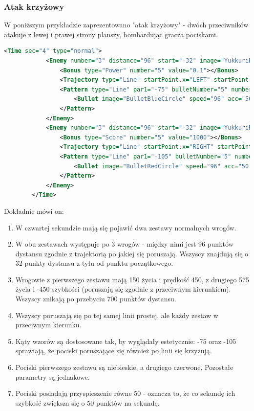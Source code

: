 		
		\newpage
		\subsubsection{Atak krzyżowy}
		W poniższym przykładzie zaprezentowano "atak krzyżowy" - dwóch przeciwników atakuje z lewej i prawej strony planszy, bombardując gracza pociskami.
		\begin{lstlisting}[language=xml]
		<Time sec="4" type="normal">
			<Enemy number="3" distance="96" start="-32" image="YukkuriReimu" life="150" speed="450" length="700">
				<Bonus type="Power" number="5" value="0.1"></Bonus>
				<Trajectory type="Line" startPoint.x="LEFT" startPoint.y="ONE_THIRDS" a="0"></Trajectory>
				<Pattern type="Line" par1="-75" bulletNumber="5" number="15" interval="0.1">
					<Bullet image="BulletBlueCircle" speed="96" acc="50.0" width="32" height="32" hitboxSize="HALF"></Bullet>
				</Pattern>
			</Enemy>
			<Enemy number="3" distance="96" start="-32" image="YukkuriReimu" life="575" speed="-450" length="700">
				<Bonus type="Score" number="5" value="1000"></Bonus>
				<Trajectory type="Line" startPoint.x="RIGHT" startPoint.y="ONE_THIRDS" a="0"></Trajectory>
				<Pattern type="Line" par1="-105" bulletNumber="5" number="15" interval="0.1">
					<Bullet image="BulletRedCircle" speed="96" acc="50.0" width="32" height="32" hitboxSize="HALF"></Bullet>
				</Pattern>
			</Enemy>
		</Time>
		\end{lstlisting}
	 	Dokładnie mówi on:
		\begin{enumerate}
			\item W czwartej sekundzie mają się pojawić dwa zestawy normalnych wrogów.
			\item W obu zestawach występuje po 3 wrogów - między nimi jest 96 punktów dystansu zgodnie z trajektorią po jakiej się poruszają. Wszyscy znajdują się o 32 punkty dystansu z tyłu od punktu początkowego.
			\item Wrogowie z pierwszego zestawu mają 150 życia i prędkość 450, z drugiego 575 życia i -450 szybkości (poruszają się zgodnie z przeciwnym kierunkiem). Wszyscy znikają po przebyciu 700 punktów dystansu.
			\item Wszyscy poruszają się po tej samej linii prostej, ale każdy zestaw w przeciwnym kierunku.
			\item Kąty wzorów są dostosowane tak, by wyglądały estetycznie: -75 oraz -105 sprawiają, że pociski poruszające się również po linii się krzyżują.
			\item Pociski pierwszego zestawu są niebieskie, a drugiego czerwone. Pozostałe parametry są jednakowe.
			\item Pociski posiadają przyspieszenie równe 50 - oznacza to, że co sekundę ich szybkość zwiększa się o 50 punktów na sekundę.
		\end{enumerate}

